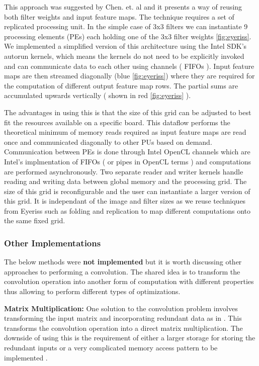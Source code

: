 This approach was suggested by Chen. et. al \cite{eyeriss} and it presents a way of reusing both filter weights and input feature maps. The technique requires a set of replicated processing unit. In the simple case of 3x3 filters we can instantiate 9 processing elements (PEs) each holding one of the 3x3 filter weights \ref{fig:eyeriss}. We implemented a simplified version of this architecture using the Intel SDK’s autorun kernels, which means the kernels do not need to be explicitly invoked and can communicate data to each other using channels ( FIFOs ). Input feature maps are then streamed diagonally (blue \ref{fig:eyeriss}) where they are required for the computation of different output feature map rows. The partial sums are accumulated upwards vertically ( shown in red \ref{fig:eyeriss} ). 

The advantages in using this is that the size of this grid can be adjusted to best fit the resources available on a specific board. This dataflow performs the theoretical minimum of memory reads required as input feature maps are read once and communicated diagonally to other PUs based on demand. Communication between PEs is done through Intel OpenCL channels which are Intel’s implmentation of FIFOs ( or pipes in OpenCL terms ) and computations are performed asynchronously. Two separate reader and writer kernels handle reading and writing data between global memory and the processing grid. The size of this grid is reconfigurable and the user can instantiate a larger version of this grid. It is independant of the image and filter sizes as we reuse techniques from Eyeriss \cite{eyeriss} such as folding and replication to map different computations onto the same fixed grid.


\subsubsection{Other Implementations}

The below methods were \textbf{not implemented} but it is worth discussing other approaches to performing a convolution. The shared idea is to transform the convolution operation into another form of computation with different properties thus allowing to perform different types of optimizations. 

\textbf{Matrix Multiplication:} One solution to the convolution problem involves transforming the input matrix and incorporating redundant data as in \cite{cudnn}. This transforms the convolution operation into a direct matrix multiplication. The downside of using this is the requirement of either a larger storage for storing the redundant inputs or a very complicated memory access pattern to be implemented \cite{ddl}.

